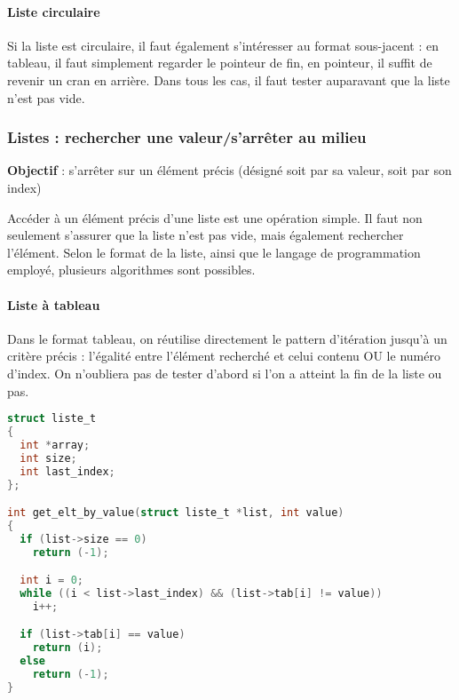 \documentclass[11pt,a4paper]{article}
\begin{document}
\bigskip


\paragraph{Liste circulaire}

Si la liste est circulaire, il faut également s'intéresser au format sous-jacent : en tableau, il faut simplement regarder le pointeur de fin, en pointeur, il suffit de revenir un cran en arrière.
Dans tous les cas, il faut tester auparavant que la liste n'est pas vide.

\vfillLast

\clearpage

\subsubsection{Listes : rechercher une valeur/s'arrêter au milieu}

\textbf{Objectif} : s'arrêter sur un élément précis (désigné soit par sa valeur, soit par son index)

\bigskip

Accéder à un élément précis d'une liste est une opération simple.
Il faut non seulement s'assurer que la liste n'est pas vide, mais également rechercher l'élément.
Selon le format de la liste, ainsi que le langage de programmation employé, plusieurs algorithmes sont possibles.

\vfillFirst

\paragraph{Liste à tableau}

Dans le format tableau, on réutilise directement le pattern d'itération jusqu'à un critère précis : l'égalité entre l'élément recherché et celui contenu OU le numéro d'index.
On n'oubliera pas de tester d'abord si l'on a atteint la fin de la liste ou pas.

\medskip

\begin{lstlisting}[language=C]
struct liste_t
{
  int *array;
  int size;
  int last_index;
};

int get_elt_by_value(struct liste_t *list, int value)
{
  if (list->size == 0)
    return (-1);

  int i = 0;
  while ((i < list->last_index) && (list->tab[i] != value))
    i++;

  if (list->tab[i] == value)
    return (i);
  else
    return (-1);
} \end{lstlisting}
\end{document}
